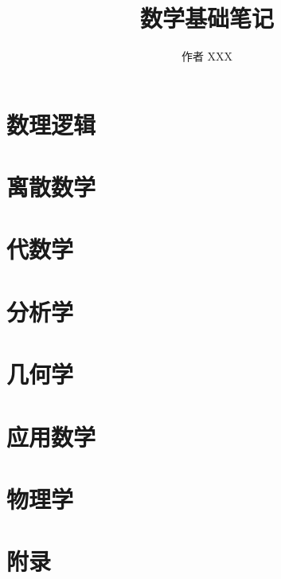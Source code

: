 



\makeindex
\title{数学基础笔记}
\author{作者 XXX}


\frontmatter



\tableofcontents

\mainmatter
\part{数理逻辑}



\part{离散数学}

\part{代数学}

\part{分析学}

\part{几何学}

\part{应用数学}

\part{物理学}

\part{附录}
\appendix

\backmatter

\printindex


